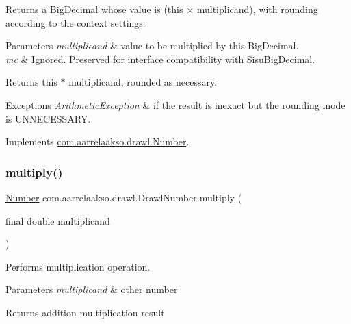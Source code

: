 Returns a Big\+Decimal whose value is (this × multiplicand), with rounding according to the context settings. 


\begin{DoxyParams}{Parameters}
{\em multiplicand} & value to be multiplied by this Big\+Decimal. \\
\hline
{\em mc} & Ignored. Preserved for interface compatibility with Sisu\+Big\+Decimal. \\
\hline
\end{DoxyParams}
\begin{DoxyReturn}{Returns}
this $\ast$ multiplicand, rounded as necessary. 
\end{DoxyReturn}

\begin{DoxyExceptions}{Exceptions}
{\em Arithmetic\+Exception} & if the result is inexact but the rounding mode is U\+N\+N\+E\+C\+E\+S\+S\+A\+RY. \\
\hline
\end{DoxyExceptions}


Implements \hyperlink{interfacecom_1_1aarrelaakso_1_1drawl_1_1_number_a8e43a4a565fb62b7f71a809aa791ecc2}{com.\+aarrelaakso.\+drawl.\+Number}.

\mbox{\label{classcom_1_1aarrelaakso_1_1drawl_1_1_drawl_number_a5595b3908527eb8a893f9c0a5d061677}} 
\subsubsection{\texorpdfstring{multiply()}{multiply()}\hspace{0.1cm}{\footnotesize\ttfamily [3/3]}}
{\footnotesize\ttfamily \hyperlink{interfacecom_1_1aarrelaakso_1_1drawl_1_1_number}{Number} com.\+aarrelaakso.\+drawl.\+Drawl\+Number.\+multiply (\begin{DoxyParamCaption}\item[{final double}]{multiplicand }\end{DoxyParamCaption})}



Performs multiplication operation. 


\begin{DoxyParams}{Parameters}
{\em multiplicand} & other number \\
\hline
\end{DoxyParams}
\begin{DoxyReturn}{Returns}
addition multiplication result 
\end{DoxyReturn}


